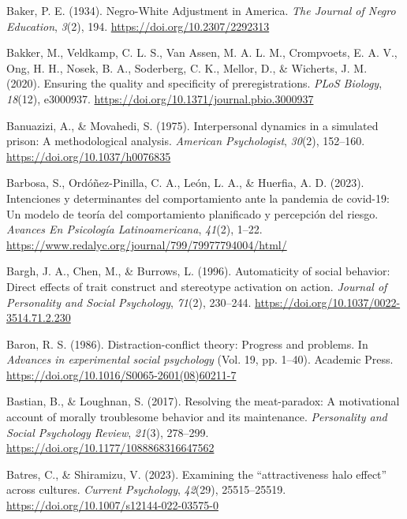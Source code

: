 \documentclass[
  letterpaper,
]{book}
\newlength{\cslhangindent}
\newenvironment{CSLReferences}[2] %
 {\begin{list}{}{%
  \setlength{\itemindent}{0pt}
  \setlength{\leftmargin}{0pt}
  \setlength{\parsep}{0pt}
  \ifodd #1
   \setlength{\leftmargin}{\cslhangindent}
   \setlength{\itemindent}{-1\cslhangindent}
  \fi
  \setlength{\itemsep}{#2\baselineskip}}}
 {\end{list}}
\begin{document}
\begin{CSLReferences}{1}{0}
Baker, P. E. (1934). Negro-{White} {Adjustment} in {America}. \emph{The
Journal of Negro Education}, \emph{3}(2), 194.
\url{https://doi.org/10.2307/2292313}

Bakker, M., Veldkamp, C. L. S., Van Assen, M. A. L. M., Crompvoets, E.
A. V., Ong, H. H., Nosek, B. A., Soderberg, C. K., Mellor, D., \&
Wicherts, J. M. (2020). Ensuring the quality and specificity of
preregistrations. \emph{PLoS Biology}, \emph{18}(12), e3000937.
\url{https://doi.org/10.1371/journal.pbio.3000937}

Banuazizi, A., \& Movahedi, S. (1975). Interpersonal dynamics in a
simulated prison: {A} methodological analysis. \emph{American
Psychologist}, \emph{30}(2), 152--160.
\url{https://doi.org/10.1037/h0076835}

Barbosa, S., Ordóñez-Pinilla, C. A., León, L. A., \& Huerfia, A. D.
(2023). Intenciones y determinantes del comportamiento ante la pandemia
de covid-19: Un modelo de teoría del comportamiento planificado y
percepción del riesgo. \emph{Avances En Psicología Latinoamericana},
\emph{41}(2), 1--22.
\url{https://www.redalyc.org/journal/799/79977794004/html/}

Bargh, J. A., Chen, M., \& Burrows, L. (1996). Automaticity of social
behavior: {Direct} effects of trait construct and stereotype activation
on action. \emph{Journal of Personality and Social Psychology},
\emph{71}(2), 230--244. \url{https://doi.org/10.1037/0022-3514.71.2.230}

Baron, R. S. (1986). Distraction-conflict theory: Progress and problems.
In \emph{Advances in experimental social psychology} (Vol. 19, pp.
1--40). Academic Press.
\url{https://doi.org/10.1016/S0065-2601(08)60211-7}

Bastian, B., \& Loughnan, S. (2017). Resolving the meat-paradox: A
motivational account of morally troublesome behavior and its
maintenance. \emph{Personality and Social Psychology Review},
\emph{21}(3), 278--299. \url{https://doi.org/10.1177/1088868316647562}

Batres, C., \& Shiramizu, V. (2023). Examining the {``attractiveness
halo effect''} across cultures. \emph{Current Psychology},
\emph{42}(29), 25515--25519.
\url{https://doi.org/10.1007/s12144-022-03575-0}


\end{CSLReferences}
\end{document}
